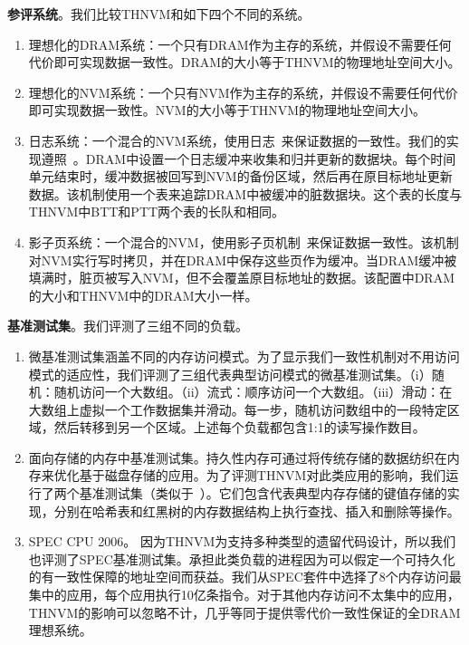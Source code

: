 \textbf{参评系统}。我们比较THNVM和如下四个不同的系统。
\begin{enumerate}
\item 理想化的DRAM系统：一个只有DRAM作为主存的系统，并假设不需要任何代价即可实现数据一致性。DRAM的大小等于THNVM的物理地址空间大小。 
\item 理想化的NVM系统：一个只有NVM作为主存的系统，并假设不需要任何代价即可实现数据一致性。NVM的大小等于THNVM的物理地址空间大小。 
\item 日志系统：一个混合的NVM系统，使用日志~\cite{DeWitt:1984:ITM:602259.602261, Hagmann:1987:RCF:41457.37518,
ext4}来保证数据的一致性。我们的实现遵照~\cite{Remzi:Journaling}。DRAM中设置一个日志缓冲来收集和归并更新的数据块。每个时间单元结束时，缓冲数据被回写到NVM的备份区域，然后再在原目标地址更新数据。该机制使用一个表来追踪DRAM中被缓冲的脏数据块。这个表的长度与THNVM中BTT和PTT两个表的长队和相同。 
\item 影子页系统：一个混合的NVM，使用影子页机制~\cite{bernstein2009principles}来保证数据一致性。该机制对NVM实行写时拷贝，并在DRAM中保存这些页作为缓冲。当DRAM缓冲被填满时，脏页被写入NVM，但不会覆盖原目标地址的数据。该配置中DRAM的大小和THNVM中的DRAM大小一样。
\end{enumerate}
 
\textbf{基准测试集}。我们评测了三组不同的负载。

\begin{enumerate}
\item 微基准测试集涵盖不同的内存访问模式。为了显示我们一致性机制对不用访问模式的适应性，我们评测了三组代表典型访问模式的微基准测试集。（i）随机：随机访问一个大数组。（ii）流式：顺序访问一个大数组。（iii）滑动：在大数组上虚拟一个工作数据集并滑动。每一步，随机访问数组中的一段特定区域，然后转移到另一个区域。上述每个负载都包含1:1的读写操作数目。
\item 面向存储的内存中基准测试集。持久性内存可通过将传统存储的数据纺织在内存来优化基于磁盘存储的应用。为了评测THNVM对此类应用的影响，我们运行了两个基准测试集（类似于~\cite{Coburn:2011:NMP:1950365.1950380, Zhao:2013:KCP:2540708.2540744}）。它们包含代表典型内存存储的键值存储的实现，分别在哈希表和红黑树的内存数据结构上执行查找、插入和删除等操作。 
\item SPEC CPU 2006。 因为THNVM为支持多种类型的遗留代码设计，所以我们也评测了SPEC基准测试集。承担此类负载的进程因为可以假定一个可持久化的有一致性保障的地址空间而获益。我们从SPEC套件中选择了8个内存访问最集中的应用，每个应用执行10亿条指令。对于其他内存访问不太集中的应用，THNVM的影响可以忽略不计，几乎等同于提供零代价一致性保证的全DRAM理想系统。 
\end{enumerate}

